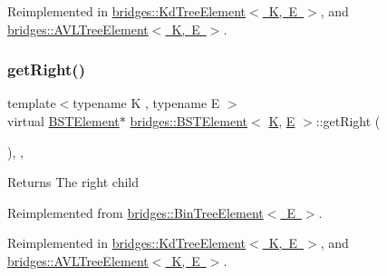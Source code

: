 Reimplemented in \mbox{\hyperlink{classbridges_1_1_kd_tree_element_ab58af4ca67cb3869c279bfc11952c070}{bridges\+::\+Kd\+Tree\+Element$<$ K, E $>$}}, and \mbox{\hyperlink{classbridges_1_1_a_v_l_tree_element_a61e075db5414b7bd6f52d657401acda3}{bridges\+::\+A\+V\+L\+Tree\+Element$<$ K, E $>$}}.

\mbox{\label{classbridges_1_1_b_s_t_element_a35e93bce32de933522dccde5f2b5ffd9}} 
\subsubsection{\texorpdfstring{getRight()}{getRight()}\hspace{0.1cm}{\footnotesize\ttfamily [1/2]}}
{\footnotesize\ttfamily template$<$typename K , typename E $>$ \\
virtual \mbox{\hyperlink{classbridges_1_1_b_s_t_element}{B\+S\+T\+Element}}$\ast$ \mbox{\hyperlink{classbridges_1_1_b_s_t_element}{bridges\+::\+B\+S\+T\+Element}}$<$ \mbox{\hyperlink{namespacebridges_acfb0a4f7877d8f63de3e6862004c50edaa5f3c6a11b03839d46af9fb43c97c188}{K}}, \mbox{\hyperlink{namespacebridges_acfb0a4f7877d8f63de3e6862004c50eda3a3ea00cfc35332cedf6e5e9a32e94da}{E}} $>$\+::get\+Right (\begin{DoxyParamCaption}{ }\end{DoxyParamCaption})\hspace{0.3cm}{\ttfamily [inline]}, {\ttfamily [override]}, {\ttfamily [virtual]}}

\begin{DoxyReturn}{Returns}
The right child 
\end{DoxyReturn}


Reimplemented from \mbox{\hyperlink{classbridges_1_1_bin_tree_element_a5751f2fe38e2364f68dc37939fce060f}{bridges\+::\+Bin\+Tree\+Element$<$ E $>$}}.



Reimplemented in \mbox{\hyperlink{classbridges_1_1_kd_tree_element_a8e1090891a720231c2009d1d222471e9}{bridges\+::\+Kd\+Tree\+Element$<$ K, E $>$}}, and \mbox{\hyperlink{classbridges_1_1_a_v_l_tree_element_a909b46ebf3e8c6a3434762a1f01499e2}{bridges\+::\+A\+V\+L\+Tree\+Element$<$ K, E $>$}}.

\mbox{\label{classbridges_1_1_b_s_t_element_ae4e7b750eada97074a42e7f54b320a29}} 
